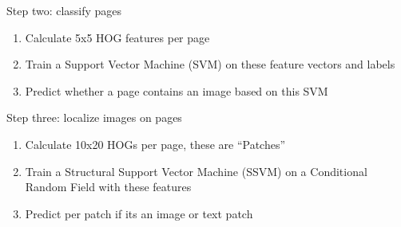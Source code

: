 {
	Step two: classify pages
	\begin{enumerate}
		\item Calculate 5x5 HOG features per page
		\item Train a Support Vector Machine (SVM) on these feature vectors and
		labels
		\item Predict whether a page contains an image based on this SVM
	\end{enumerate}
	Step three: localize images on pages
	\begin{enumerate}
		\item Calculate 10x20 HOGs per page, these are ``Patches''
		\item Train a Structural Support Vector Machine (SSVM) on a
			Conditional Random Field with these features
		\item Predict per patch if its an image or text patch
	\end{enumerate}
}
